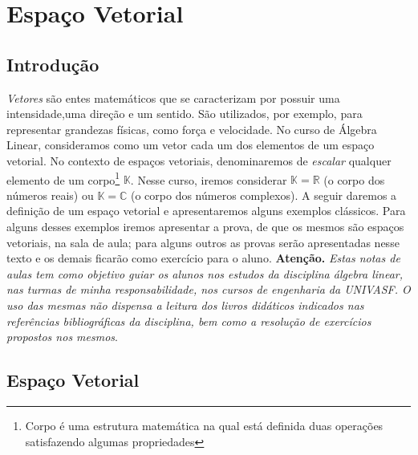 \chapter{Espaço  Vetorial}
\thispagestyle{empty}

\section{Introdução}
\textit{Vetores} são entes matemáticos que se caracterizam por  possuir uma  intensidade,uma direção e um sentido. São utilizados, por exemplo, para representar grandezas físicas, como força e velocidade. No curso de Álgebra Linear, consideramos como  um vetor cada um dos  elementos de um   espaço vetorial.  No  contexto de espaços vetoriais, denominaremos de  \textit{escalar} qualquer elemento de um corpo\footnote{Corpo é uma estrutura matemática na qual está definida duas operações satisfazendo algumas propriedades} $\mathbb{K}$.  Nesse curso, iremos considerar $\mathbb{K}= \mathbb{R}$ (o corpo dos números reais) ou $\mathbb{K}=\mathbb{C}$ (o corpo dos números complexos).  A seguir daremos a definição de um espaço vetorial e apresentaremos alguns exemplos clássicos. Para alguns desses exemplos iremos apresentar a  prova,  de que os  mesmos  são espaços vetoriais,  na sala de aula; para alguns outros as provas serão apresentadas nesse texto e os demais ficarão como exercício para o aluno.   \textbf{Atenção.} \textit{Estas notas de aulas tem como objetivo guiar os alunos nos  estudos da disciplina álgebra linear, nas turmas de minha responsabilidade, nos cursos de engenharia da UNIVASF. O uso das mesmas  não dispensa  a leitura  dos livros didáticos indicados nas referências bibliográficas da disciplina, bem como a resolução de exercícios propostos nos mesmos}.

\section{Espaço Vetorial }

